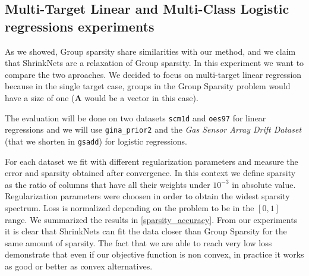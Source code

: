 \subsection{Multi-Target Linear and Multi-Class Logistic regressions experiments}
As we showed, Group sparsity share similarities with our method, and we claim
that ShrinkNets are a relaxation of Group sparsity.  In this experiment we want
to compare the two aproaches.  We decided to focus on multi-target linear
regression because in the single target case, groups in the Group Sparsity
problem would have a size of one ($\bm{A}$ would be a vector in this case).

The evaluation will be done on two datasets \texttt{scm1d} and \texttt{oes97}
\cite{Spyromitros-Xioufis2016} for linear regressions and we will use \texttt{gina\_prior2} \cite{4371065} and
the \textit{Gas Sensor Array Drift Dataset} \cite{VERGARA2012320} (that we shorten in
\texttt{gsadd}) for logistic regressions.

For each dataset we fit with different regularization parameters and measure
the error and sparsity obtained after convergence. In this context we define
sparsity as the ratio of columns that have all their weights under $10^{-3}$ in
absolute value. Regularization parameters were choosen in order to obtain the
widest sparsity spectrum. Loss is normalized depending on the problem to be in
the $[0, 1]$ range. We summarized the results in \cref{sparsity_accuracy}. From
our experiments it is clear that ShrinkNets can fit the data closer than Group
Sparsity for the same amount of sparsity. The fact that we are able to reach
very low loss demonstrate that even if our objective function is non convex, in
practice it works as good or better as convex alternatives.
